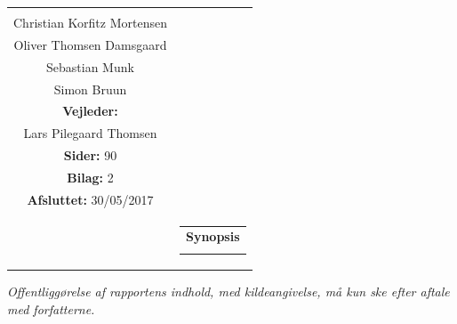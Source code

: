 \begin{titlepage}
\begin{nopagebreak}
{\begin{tabular}{cc}
{{\textbf{Medvirkende:}\\
Christian Korfitz Mortensen \\
Oliver Thomsen Damsgaard \\
Sebastian Munk \\
Simon Bruun \\

\textbf{Vejleder:}\\
Lars Pilegaard Thomsen
}\\

\textbf{Sider:} 90\\
\textbf{Bilag:} 2 \\
\textbf{Afsluttet:} 30/05/2017\\

\vfill } &
\parbox{7cm}{
  \vspace{.15cm}
  \hfill
  \begin{tabular}{l}
  {\textbf{Synopsis}}\bigskip \\
  \fbox{
    \parbox{6.5cm}{\bigskip
     {\vfill{\small 
     \bigskip}}
     }}
   \end{tabular}}
\end{tabular}} %


\centering
\textit{Offentliggørelse af rapportens indhold, med kildeangivelse, må kun ske efter aftale med forfatterne.}\\

\end{nopagebreak}
\end{titlepage}
%